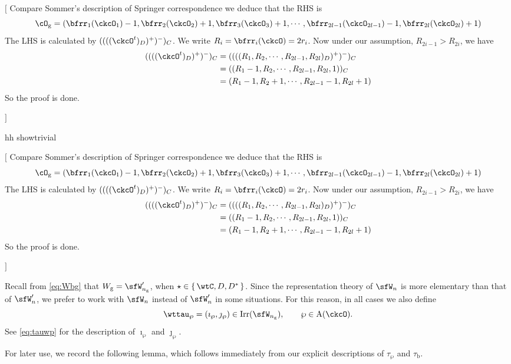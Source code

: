 \documentclass[12pt,a4paper]{amsart}
\newcommand{\trivial}[2][]{\if\relax\detokenize{#1}\relax
  {%
      \color{orange} \vspace{0em} $[$  #2 $]$
      \color{black}
  }
  \else
\ifx#1h
\ifcsname showtrivial\endcsname
{%
    \color{orange} \vspace{0em}  $[$ #2 $]$
    \color{black}
}
\fi
\else {\red Wrong argument!} \fi
\fi
}
\numberwithin{equation}{section}
\theoremstyle{remark}
\newtheorem{remark}[thm]{Remark}
\def\Irr{\mathrm{Irr}}
\def\dBV{d_{\mathrm{BV}}}
\def\Wg{W_{\mathrm g}}
\def\cuprow{{\stackrel{r}{\sqcup}}}
\def\cupcol{{\stackrel{c}{\sqcup}}}
\def\cuprow{{\,\stackrel{r}{\sqcup}\,}}
\def\cupcol{{\,\stackrel{c}{\sqcup}\,}}
\begin{document}
    \trivial[h]{ Compare Sommer's description of Springer correspondence we
      deduce that the RHS is
      \[
        \cO_{\mathrm g} = (\bfrr_{1}(\ckcO_{1})-1,\bfrr_{2}(\ckcO_{2})+1,\bfrr_{3}(\ckcO_{3})+1, \cdots, \bfrr_{2l-1}(\ckcO_{2l-1})-1,\bfrr_{2l}(\ckcO_{2l})+1)
      \]
      The LHS is calculated by $((((\ckcO^{t})_{D})^{+})^{-})_{C}$. We write
      $R_{i}=\bfrr_{i}(\ckcO)=2r_{i}$. Now under our assumption,
      $R_{2i-1}>R_{2i}$, we have
      \[
        \begin{split}
          ((((\ckcO^{t})_{D})^{+})^{-})_{C} &=
          ((((R_{1},R_{2}, \cdots, R_{2l-1},R_{2l})_{D})^{+})^{-})_{C}\\
          &=((R_{1}-1,R_{2}, \cdots, R_{2l-1},R_{2l},1))_{C}\\
          &=(R_{1}-1,R_{2}+1, \cdots, R_{2l-1}-1,R_{2l}+1)\\
        \end{split}
      \]
      So the proof is done.

    }



%

Recall from \eqref{eq:Wbg} that $\Wg =\sfW'_{n_{\mathrm g}}$, when $\star \in \set{\wtC,D,D^{*}}$. Since the representation theory of $\sfW_{n}$ is more elementary than that of
$\sfW'_{n}$, we prefer to work with $\sfW_n$ instead of $\sfW_n'$ in some situations. For this reason, in all cases we also define
\begin{equation}\label{eq:ttauwp}
\wttau_{\wp} = (\imath_{\wp},\jmath_{\wp})\in \Irr(\sfW_{n_\mathrm g}), \qquad \wp\in {\mathrm A}(\ckcO).
\end{equation}
See \eqref{eq:tauwp} for the description of $\imath_{\wp}$ and $\jmath_{\wp}$.

For later use, we record the following lemma, which follows immediately from our explicit descriptions of $\tau_{\wp}$ and $\tau_{\mathrm b}$.
\end{document}
